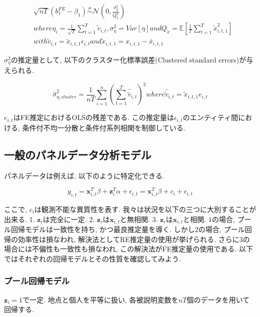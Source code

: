 \documentclass[paper=a4paper,fontsize=10pt]{jlreq}
\begin{document}
\begin{align*}
  &\sqrt{nT}(b_1^{FE} - \beta_1) \overset{a}{\sim} \mathcal{N}({0}, \frac{\sigma_\eta^2}{Q_{\tilde{x}}^2})\\
  &where　\eta_i = \frac{1}{\sqrt{T}}\sum_{t=1}^{T}\tilde{v}_{i,t},　\sigma_\eta^2 = Var[\eta]　and　Q_{\tilde{x}} = \mathbb{E}[\frac{1}{T}\sum_{t=1}^{T}\tilde{x}_{i,t,1}^2]\\
  &with　\tilde{v}_{i,t} = \tilde{x}_{i,t,1} \epsilon_{i,t}　and　\tilde{x}_{i,t,1} = {x}_{i,t,1} - \bar{x}_{i,t,1}
\end{align*}

$\sigma_\eta^2$の推定量として, 以下のクラスター化標準誤差(Clustered standard errors)が与えられる.

\begin{equation*}
  \hat{\sigma}_{\eta, cluster}^2 = \frac{1}{nT} \sum_{i=1}^{n} (\sum_{t=1}^{T}\hat{\tilde{v}}_{i,t})^2　where　\hat{\tilde{v}}_{i,t} = \tilde{x}_{i,t,1} e_{i,t}
\end{equation*}

$e_{i,t}$はFE推定におけるOLSの残差である. この推定量は$\epsilon_{i,t}$のエンティティ間における, 条件付不均一分散と条件付系列相関を制御している.\\

\subsection{一般のパネルデータ分析モデル}
パネルデータは例えば, 以下のように特定化できる.

\begin{equation*}
 y_{i,t} = \mathbf{x}_{i,t}^T \beta + \mathbf{z}_{i}^T \alpha + \epsilon_{i,t} = \mathbf{x}_{i,t}^T \beta + c_i + \epsilon_{i,t}
\end{equation*}

ここで, $c_i$は観測不能な異質性を表す. 我々は状況を以下の三つに大別することが出来る. 1. $\mathbf{z}_i$は完全に一定. 2. $\mathbf{z}_i$は$\mathbf{x}_{i,t}$と無相関. 3. $\mathbf{z}_i$は$\mathbf{x}_{i,t}$と相関. $1$の場合, プール回帰モデルは一致性を持ち, かつ最良推定量を導く. しかし$2$の場合, プール回帰の効率性は損なわれ, 解決法としてRE推定量の使用が挙げられる. さらに$3$の場合には不偏性も一致性も損なわれ, この解決法がFE推定量の使用である. 以下ではそれぞれの回帰モデルとその性質を確認してみよう.\\

\subsubsection{プール回帰モデル}
$\mathbf{z}_{i} = 1$で一定. 地点と個人を平等に扱い, 各被説明変数を$nT$個のデータを用いて回帰する. 
\end{document}
